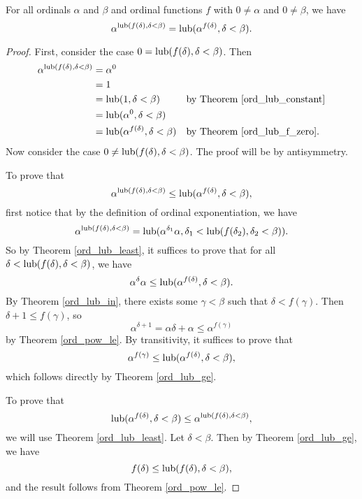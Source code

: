 \documentclass[../../math.tex]{subfiles}
\begin{document}
\begin{theorem} \label{ord_lub_pow}
    For all ordinals $\alpha$ and $\beta$ and ordinal functions $f$ with $0 \neq
    \alpha$ and $0 \neq \beta$, we have
    \[
        \alpha^{\operatorname{lub}(f(\delta), \delta < \beta)}
        = \operatorname{lub}(\alpha^{f(\delta)}, \delta < \beta).
    \]
\end{theorem}
\begin{proof}
    First, consider the case $0 = \operatorname{lub}(f(\delta), \delta < \beta)$.  Then
    \begin{align*}
        \alpha^{\operatorname{lub}(f(\delta), \delta < \beta)}
        &= \alpha^0
            && \\
        &= 1
            && \\
        &= \operatorname{lub}(1, \delta < \beta)
            && \text{by Theorem \ref{ord_lub_constant}} \\
        &= \operatorname{lub}(\alpha^0, \delta < \beta)
            && \\
        &= \operatorname{lub}(\alpha^{f(\delta)}, \delta < \beta)
            && \text{by Theorem \ref{ord_lub_f_zero}.}
    \end{align*}
    Now consider the case $0 \neq \operatorname{lub}(f(\delta), \delta < \beta)$.  The proof
    will be by antisymmetry.

    To prove that
    \[
        \alpha^{\operatorname{lub}(f(\delta), \delta < \beta)}
        \leq \operatorname{lub}(\alpha^{f(\delta)}, \delta < \beta),
    \]
    first notice that by the definition of ordinal exponentiation, we have
    \[
        \alpha^{\operatorname{lub}(f(\delta), \delta < \beta)}
        = \operatorname{lub}(\alpha^{\delta_1} \alpha, \delta_1 < \operatorname{lub}(f(\delta_2), \delta_2 <
        \beta)).
    \]
    So by Theorem \ref{ord_lub_least}, it suffices to prove that for all $\delta
    < \operatorname{lub}(f(\delta), \delta < \beta)$, we have
    \[
        \alpha ^ \delta \alpha \leq \operatorname{lub}(\alpha^{f(\delta)}, \delta < \beta).
    \]
    By Theorem \ref{ord_lub_in}, there exists some $\gamma < \beta$ such that
    $\delta < f(\gamma)$.  Then $\delta + 1 \leq f(\gamma)$, so
    \[
        \alpha^{\delta + 1} = \alpha\delta + \alpha \leq \alpha^{f(\gamma)}
    \]
    by Theorem \ref{ord_pow_le}.  By transitivity, it suffices to prove that
    \[
        \alpha^{f(\gamma)}
        \leq \operatorname{lub}(\alpha^{f(\delta)}, \delta < \beta),
    \]
    which follows directly by Theorem \ref{ord_lub_ge}.

    To prove that
    \[
        \operatorname{lub}(\alpha^{f(\delta)}, \delta < \beta)
        \leq \alpha^{\operatorname{lub}(f(\delta), \delta < \beta)},
    \]
    we will use Theorem \ref{ord_lub_least}.  Let $\delta < \beta$.  Then by
    Theorem \ref{ord_lub_ge}, we have
    \[
        f(\delta) \leq \operatorname{lub}(f(\delta), \delta < \beta),
    \]
    and the result follows from Theorem \ref{ord_pow_le}.
\end{proof}
\end{document}
